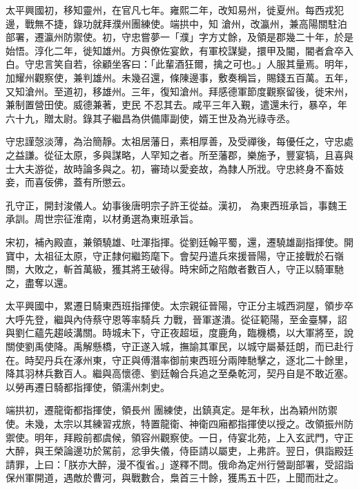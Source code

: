 \begin{pinyinscope}
 太平興國初，移知靈州，在官凡七年。雍熙二年，改知易州，徙夏州。每西戎犯邊，戰無不捷，錄功就拜濮州團練使。端拱中，知
 滄州，改瀛州，兼高陽關駐泊部署，遷瀛州防禦使。初，守忠嘗夢一「濮」字方丈餘，及領是郡幾二十年，於是始悟。淳化二年，徙知雄州。方與僚佐宴飲，有軍校謀變，擐甲及閽，閽者倉卒入白。守忠言笑自若，徐顧坐客曰：「此輩酒狂爾，擒之可也。」人服其量焉。明年，加耀州觀察使，兼判雄州。未幾召還，條陳邊事，敷奏稱旨，賜錢五百萬。五年，又知滄州。至道初，移雄州。三年，復知滄州。拜感德軍節度觀察留後，徙宋州，兼制置營田使。威德兼著，吏民
 不忍其去。咸平三年入覲，遣還未行，暴卒，年六十九，贈太尉。錄其子繼昌為供備庫副使，婿王世及為光祿寺丞。



 守忠謹愨淡薄，為治簡靜。太祖居藩日，素相厚善，及受禪後，每優任之，守忠處之益謙。從征太原，多與謀略，人罕知之者。所至藩郡，樂施予，豐宴犒，且喜與士大夫游從，故時論多與之。初，審琦以愛妾故，為隸人所戕。守忠終身不畜妓妾，而喜佞佛，蓋有所懲云。



 孔守正，開封浚儀人。幼事後唐明宗子許王從益。漢初，
 為東西班承旨，事魏王承訓。周世宗征淮南，以材勇選為東班承旨。



 宋初，補內殿直，兼領驍雄、吐渾指揮。從劉廷翰平蜀，還，遷驍雄副指揮使。開寶中，太祖征太原，守正隸何繼筠麾下。會契丹遣兵來援晉陽，守正接戰於石嶺關，大敗之，斬首萬級，獲其將王破得。時宋師之陷敵者數百人，守正以騎軍馳之，盡奪以還。



 太平興國中，累遷日騎東西班指揮使。太宗親征晉陽，守正分主城西洞屋，領步卒大呼先登，繼與內侍蔡守恩等率騎兵
 力戰，晉軍遂潰。從征範陽，至金臺驛，詔與劉仁蘊先趨岐溝關。時城未下，守正夜超垣，度鹿角，臨機橋，以大軍將至，說關使劉禹使降。禹解懸橋，守正遂入城，撫諭其軍民，以城守屬綦廷朗，而已赴行在。時契丹兵在涿州東，守正與傅潛率御前東西班分兩陣馳擊之，逐北二十餘里，降其羽林兵數百人。繼與高懷德、劉廷翰合兵追之至桑乾河，契丹自是不敢近塞。以勞再遷日騎都指揮使，領濡州刺史。



 端拱初，遷龍衛都指揮使，領長州
 團練使，出鎮真定。是年秋，出為穎州防禦使。未幾，太宗以其練習戎旅，特置龍衛、神衛四廂都指揮使以授之。改領振州防禦使。明年，拜殿前都虞候，領容州觀察使。一日，侍宴北苑，上入玄武門，守正大醉，與王榮論邊功於駕前，忿爭失儀，侍臣請以屬吏，上弗許。翌日，俱詣殿廷請罪，上曰：「朕亦大醉，漫不復省。」遂釋不問。俄命為定州行營副部署，受詔詣保州軍開道，遇敵於曹河，與戰數合，梟首三十餘，獲馬五十匹，上聞而壯之。




\end{pinyinscope}
